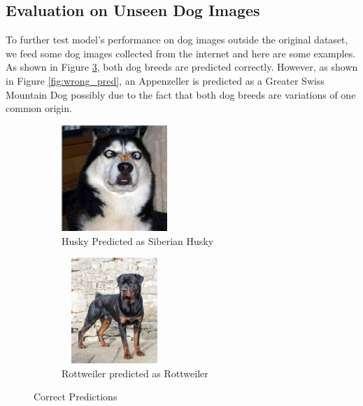 \documentclass{article}
\begin{document}
\subsection{Evaluation on Unseen Dog Images}
To further test model's performance on dog images outside the original dataset, we feed some dog images collected from the internet and here are some examples. As shown in Figure \ref{fig:correct_pred}, both dog breeds are predicted correctly. However, as shown in Figure \ref{fig:wrong_pred}, an Appenzeller is predicted as a Greater Swiss Mountain Dog possibly due to the fact that both dog breeds are variations of one common origin.

\begin{figure}[h!]
    \centering
    \begin{subfigure}{.5\textwidth}
    \centering
    \includegraphics[width=4cm,height=4cm]{husky.jpg}
    \caption{Husky Predicted as Siberian Husky}
    \label{fig:husky}
    \end{subfigure}%
    \begin{subfigure}{.5\textwidth}
    \centering
    \includegraphics[width=4cm,height=4cm]{Rottweiler.jpg}
    \caption{Rottweiler predicted as Rottweiler}
    \label{fig:rott}
    \end{subfigure}
    \caption{Correct Predictions}
\label{fig:correct_pred}
\end{figure}
\end{document}
